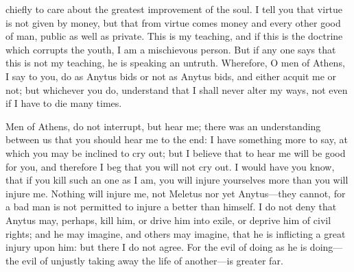 \documentclass[11pt,letter]{article}
\begin{document}
chiefly to care about the greatest improvement of the soul. I tell you that virtue is not given by money, but that from virtue comes money and every other good of man, public as well as private. This is my teaching, and if this is the doctrine which corrupts the youth, I am a mischievous person. But if any one says that this is not my teaching, he is speaking an untruth. Wherefore, O men of Athens, I say to you, do as Anytus bids or not as Anytus bids, and either acquit me or not; but whichever you do, understand that I shall never alter my ways, not even if I have to die many times.

\par  Men of Athens, do not interrupt, but hear me; there was an understanding between us that you should hear me to the end: I have something more to say, at which you may be inclined to cry out; but I believe that to hear me will be good for you, and therefore I beg that you will not cry out. I would have you know, that if you kill such an one as I am, you will injure yourselves more than you will injure me. Nothing will injure me, not Meletus nor yet Anytus—they cannot, for a bad man is not permitted to injure a better than himself. I do not deny that Anytus may, perhaps, kill him, or drive him into exile, or deprive him of civil rights; and he may imagine, and others may imagine, that he is inflicting a great injury upon him: but there I do not agree. For the evil of doing as he is doing—the evil of unjustly taking away the life of another—is greater far.
\end{document}
